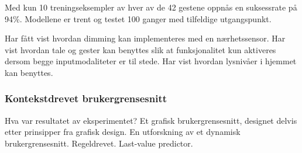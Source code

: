 Med kun 10 treningseksempler av hver av de 42 gestene oppnås en suksessrate på 94\%. Modellene er trent og testet 100 ganger med tilfeldige utgangspunkt.

Har fått vist hvordan dimming kan implementeres med en nærhetssensor. Har vist hvordan tale og gester kan benyttes slik at funksjonalitet kun aktiveres dersom begge inputmodaliteter er til stede. Har vist hvordan lysnivåer i hjemmet kan benyttes. 

\subsubsection*{Kontekstdrevet brukergrensesnitt}
{\color{red}Hva var resultatet av eksperimentet?}
Et grafisk brukergrensesnitt, designet delvis etter prinsipper fra grafisk design. En utforskning av et dynamisk brukergrensesnitt. Regeldrevet. Last-value predictor.